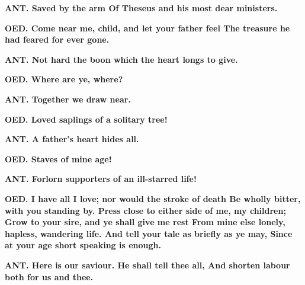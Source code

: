 \documentclass[11pt,letter]{book}
\begin{document}
\par \textbf{ANT. Saved by the arm Of Theseus and his most dear ministers.}
\par 

\par \textbf{OED. Come near me, child, and let your father feel The treasure he had feared for ever gone.}
\par 

\par \textbf{ANT. Not hard the boon which the heart longs to give.}
\par 

\par \textbf{OED. Where are ye, where?}
\par 

\par \textbf{ANT. Together we draw near.}
\par 

\par \textbf{OED. Loved saplings of a solitary tree!}
\par 

\par \textbf{ANT. A father’s heart hides all.}
\par 

\par \textbf{OED. Staves of mine age!}
\par 

\par \textbf{ANT. Forlorn supporters of an ill-starred life!}
\par 

\par \textbf{OED. I have all I love; nor would the stroke of death Be wholly bitter, with you standing by. Press close to either side of me, my children; Grow to your sire, and ye shall give me rest From mine else lonely, hapless, wandering life. And tell your tale as briefly as ye may, Since at your age short speaking is enough.}
\par 

\par \textbf{ANT. Here is our saviour. He shall tell thee all, And shorten labour both for us and thee.}
\par 
\end{document}
